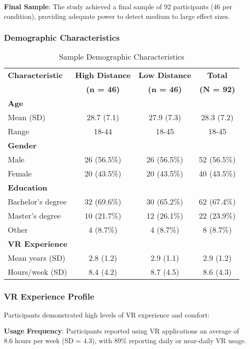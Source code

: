\documentclass[12pt]{article}
\begin{document}
\textbf{Final Sample}: The study achieved a final sample of 92 participants (46 per condition), providing adequate power to detect medium to large effect sizes.

\subsubsection{Demographic Characteristics}

\begin{table}[h]
\centering
\caption{Sample Demographic Characteristics}
\begin{tabular}{@{}lccc@{}}
\toprule
\textbf{Characteristic} & \textbf{High Distance} & \textbf{Low Distance} & \textbf{Total} \\
& \textbf{(n = 46)} & \textbf{(n = 46)} & \textbf{(N = 92)} \\
\midrule
\textbf{Age} & & & \\
Mean (SD) & 28.7 (7.1) & 27.9 (7.3) & 28.3 (7.2) \\
Range & 18-44 & 18-45 & 18-45 \\
\midrule
\textbf{Gender} & & & \\
Male & 26 (56.5\%) & 26 (56.5\%) & 52 (56.5\%) \\
Female & 20 (43.5\%) & 20 (43.5\%) & 40 (43.5\%) \\
\midrule
\textbf{Education} & & & \\
Bachelor's degree & 32 (69.6\%) & 30 (65.2\%) & 62 (67.4\%) \\
Master's degree & 10 (21.7\%) & 12 (26.1\%) & 22 (23.9\%) \\
Other & 4 (8.7\%) & 4 (8.7\%) & 8 (8.7\%) \\
\midrule
\textbf{VR Experience} & & & \\
Mean years (SD) & 2.8 (1.2) & 2.9 (1.1) & 2.9 (1.2) \\
Hours/week (SD) & 8.4 (4.2) & 8.7 (4.5) & 8.6 (4.3) \\
\bottomrule
\end{tabular}
\end{table}

\subsubsection{VR Experience Profile}

Participants demonstrated high levels of VR experience and comfort:

\textbf{Usage Frequency}: Participants reported using VR applications an average of 8.6 hours per week (SD = 4.3), with 89\% reporting daily or near-daily VR usage.
\end{document}
